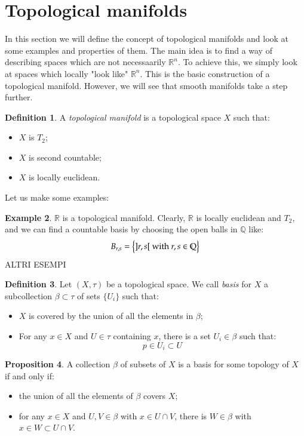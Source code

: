 \documentclass[12pt,a4paper]{report}
\theoremstyle{definition}
\newtheorem{Def}{Definition}[chapter]
\theoremstyle{Theorem}
\newtheorem{Prop}[Def]{Proposition}
\theoremstyle{break}
\newtheorem{Ex}[Def]{Example}
\theoremstyle{definition}
\begin{document}
		\section{Topological manifolds}
			In this section we will define the concept of topological manifolds and look at some examples and properties of them. The main idea is to find a way of describing spaces which are not necessaarily $\mathbb{R}^n$. To achieve this, we simply look at spaces which locally "look like" $\mathbb{R}^n$. This is the basic construction of a topological manifold. However, we will see that smooth manifolds take a step further.
			\begin{Def}
				A \textit{topological manifold} is a topological space $X$ such that:
				\begin{itemize}
					\item $X$ is $T_2$;
					\item $X$ is second countable;
					\item $X$ is locally euclidean.
				\end{itemize}
			\end{Def}
			Let us make some examples:
			\begin{Ex}
				$\mathbb{R}$ is a topological manifold. Clearly, $\mathbb{R}$ is locally euclidean and $T_2$, and we can find a countable basis by choosing the open balls in $\mathbb{Q}$ like:
				$$B_{r,s}=\big\{]r,s[\hbox{ with }r,s\in\mathbb{Q}\big\}$$
				ALTRI ESEMPI
			\end{Ex}
			\begin{Def}
				Let $(X,\tau)$ be a topological space. We call \textit{basis} for $X$ a subcollection $\beta\subset\tau$ of sets $\{U_i\}$ such that:
				\begin{itemize}
					\item $X$ is covered by the union of all the elements in $\beta$;
					\item For any $x\in X$ and $U\in \tau$ containing $x$, there is a set $U_i\in \beta$ such that:
					$$p\in U_i\subset U$$ 
				\end{itemize}
			\end{Def}
			\begin{Prop}
				A collection $\beta$ of subsets of  $X$ is a basis for some topology of $X$ if and only if:
				\begin{itemize}
					\item the union of all the elements of $\beta$ covers $X$;
					\item for any $x\in X$ and $U,V\in \beta$ with $x\in U\cap V$, there is $W\in \beta$ with $x\in W\subset U\cap V$.
				\end{itemize}
			\end{Prop}
\end{document}
